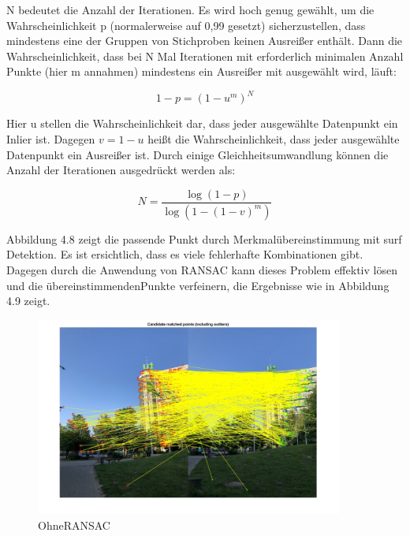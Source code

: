N bedeutet die Anzahl der Iterationen. Es wird hoch genug gewählt, um die Wahrscheinlichkeit p (normalerweise auf 0,99 gesetzt) sicherzustellen, dass mindestens eine der Gruppen von Stichproben keinen Ausreißer enthält.
Dann die Wahrscheinlichkeit, dass bei N Mal Iterationen mit erforderlich minimalen Anzahl Punkte (hier m annahmen) mindestens ein Ausreißer mit ausgewählt wird, läuft:

\begin{equation}
   1 - p = (1 - u^m)^N
\end{equation}

Hier u stellen die Wahrscheinlichkeit dar, dass jeder ausgewählte Datenpunkt ein Inlier ist. Dagegen $v = 1 - u$ heißt die Wahrscheinlichkeit, dass jeder ausgewählte Datenpunkt ein Ausreißer ist. Durch einige Gleichheitsumwandlung können die Anzahl der Iterationen ausgedrückt werden als:

\begin{equation}
   N = \frac{\log(1 - p)}{\log(1 - (1 - v)^m)}
\end{equation}

Abbildung 4.8 zeigt die passende Punkt durch Merkmalübereinstimmung mit \gls{surf} Detektion. Es ist ersichtlich, dass es viele fehlerhafte Kombinationen gibt. Dagegen durch die Anwendung von RANSAC kann dieses Problem effektiv lösen und die übereinstimmendenPunkte verfeinern, die Ergebnisse wie in Abbildung 4.9 zeigt.

\begin{figure}[H]
 \centering 
 \includegraphics[keepaspectratio,width=0.9\textwidth]{images/3_Ersteverfahren/RANSAC/OhneRANSAC.pdf}
 \caption{OhneRANSAC}
 \label{fig:OhneRANSAC}
\end{figure} 

